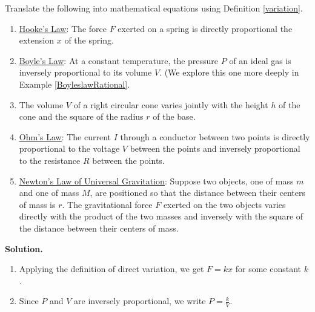 \begin{ex} \label{variationexample} Translate the following into mathematical equations using Definition \ref{variation}.

\begin{enumerate}

\item  \href{http://en.wikipedia.org/wiki/Hooke's_law}{\underline{Hooke's Law}}:   The force $F$ exerted on a spring is directly proportional the extension $x$ of the spring.

\item  \href{http://en.wikipedia.org/wiki/Boyle's_law}{\underline{Boyle's Law}}:   At a constant temperature, the pressure $P$ of an ideal gas is inversely proportional to its volume $V$.  (We explore this one more deeply in Example \ref{BoyleslawRational}.

\item  The volume $V$ of a right circular cone varies jointly with the height $h$ of the cone and the square of the radius $r$ of the base.

\item  \href{http://en.wikipedia.org/wiki/Ohm's_law}{\underline{Ohm's Law}}:   The current $I$ through a conductor between two points is directly proportional to the voltage $V$ between the points and inversely proportional to the resistance $R$ between the points.

\item \label{gravitylaw} \href{http://en.wikipedia.org/wiki/Law_of_universal_gravitation}{\underline{Newton's Law of Universal Gravitation}}:   Suppose two objects, one of mass $m$ and one of mass $M$, are positioned so that the distance between their centers of mass is $r$.  The gravitational force $F$ exerted on the two objects varies directly with the product of the two masses and inversely with the square of the distance between their centers of mass.

\end{enumerate}

{\bf Solution.}  

\begin{enumerate}

\item Applying the definition of direct variation, we get  $F = k x$ for some constant $k$.

\item Since $P$ and $V$ are inversely proportional, we write $P = \frac{k}{V}$.


\end{enumerate}
\end{ex}
